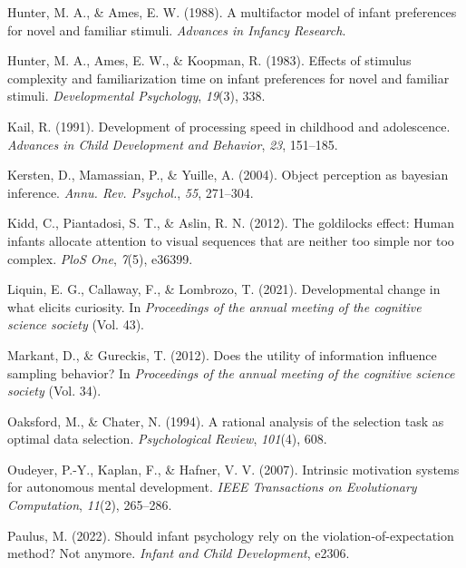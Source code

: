 \documentclass[10pt, letterpaper]{article}
\newenvironment{CSLReferences}%
  {}%
  {\par}
\begin{document}
\begin{CSLReferences}{1}{0}
\leavevmode{}%
Hunter, M. A., \& Ames, E. W. (1988). A multifactor model of infant
preferences for novel and familiar stimuli. \emph{Advances in Infancy
Research}.

\leavevmode{}%
Hunter, M. A., Ames, E. W., \& Koopman, R. (1983). Effects of stimulus
complexity and familiarization time on infant preferences for novel and
familiar stimuli. \emph{Developmental Psychology}, \emph{19}(3), 338.

\leavevmode{}%
Kail, R. (1991). Development of processing speed in childhood and
adolescence. \emph{Advances in Child Development and Behavior},
\emph{23}, 151--185.

\leavevmode{}%
Kersten, D., Mamassian, P., \& Yuille, A. (2004). Object perception as
bayesian inference. \emph{Annu. Rev. Psychol.}, \emph{55}, 271--304.

\leavevmode{}%
Kidd, C., Piantadosi, S. T., \& Aslin, R. N. (2012). The goldilocks
effect: Human infants allocate attention to visual sequences that are
neither too simple nor too complex. \emph{PloS One}, \emph{7}(5),
e36399.

\leavevmode{}%
Liquin, E. G., Callaway, F., \& Lombrozo, T. (2021). Developmental
change in what elicits curiosity. In \emph{Proceedings of the annual
meeting of the cognitive science society} (Vol. 43).

\leavevmode{}%
Markant, D., \& Gureckis, T. (2012). Does the utility of information
influence sampling behavior? In \emph{Proceedings of the annual meeting
of the cognitive science society} (Vol. 34).

\leavevmode{}%
Oaksford, M., \& Chater, N. (1994). A rational analysis of the selection
task as optimal data selection. \emph{Psychological Review},
\emph{101}(4), 608.

\leavevmode{}%
Oudeyer, P.-Y., Kaplan, F., \& Hafner, V. V. (2007). Intrinsic
motivation systems for autonomous mental development. \emph{IEEE
Transactions on Evolutionary Computation}, \emph{11}(2), 265--286.

\leavevmode{}%
Paulus, M. (2022). Should infant psychology rely on the
violation-of-expectation method? Not anymore. \emph{Infant and Child
Development}, e2306.


\end{CSLReferences}
\end{document}
